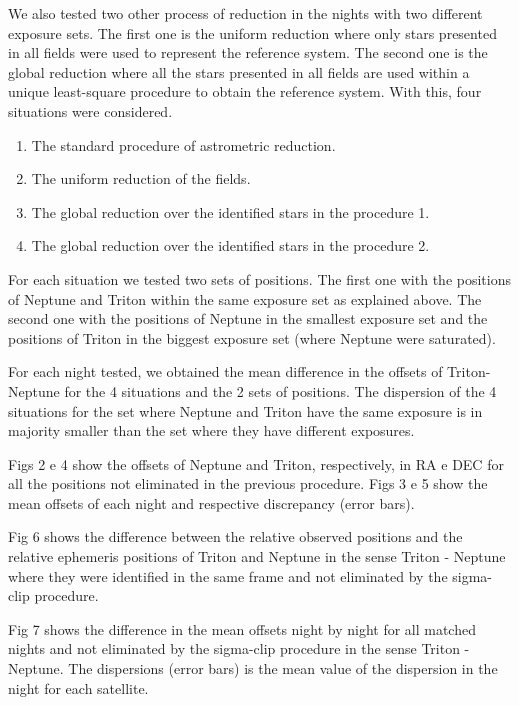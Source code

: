 \documentclass[12pt,a4paper]{report}
\begin{document}
We also tested two other process of reduction in the nights with two different exposure sets. The first one is the uniform reduction where only stars presented in all fields were used to represent the reference system. The second one is the global reduction where all the stars presented in all fields are used within a unique least-square procedure to obtain the reference system. With this, four situations were considered.

\begin{enumerate}
\item The standard procedure of astrometric reduction.
\item The uniform reduction of the fields.
\item The global reduction over the identified stars in the procedure 1.
\item The global reduction over the identified stars in the procedure 2.
\end{enumerate}

For each situation we tested two sets of positions. The first one with the positions of Neptune and Triton within the same exposure set as explained above. The second one with the positions of Neptune in the smallest exposure set and the positions of Triton in the biggest exposure set (where Neptune were saturated).

For each night tested, we obtained the mean difference in the offsets of Triton-Neptune for the 4 situations and the 2 sets of positions. The dispersion of the 4 situations for the set where Neptune and Triton have the same exposure is in majority smaller than the set where they have different exposures.

Figs 2 e 4 show the offsets of Neptune and Triton, respectively, in RA e DEC for all the positions not eliminated in the previous procedure. Figs 3 e 5 show the mean offsets of each night and respective discrepancy (error bars).

Fig 6 shows the difference between the relative observed positions and the relative ephemeris positions of Triton and Neptune in the sense Triton - Neptune where they were identified in the same frame and not eliminated by the sigma-clip procedure.

Fig 7 shows the difference in the mean offsets night by night for all matched nights and not eliminated by the sigma-clip procedure in the sense Triton - Neptune. The dispersions (error bars) is the mean value of the dispersion in the night for each satellite.

\end{document}
